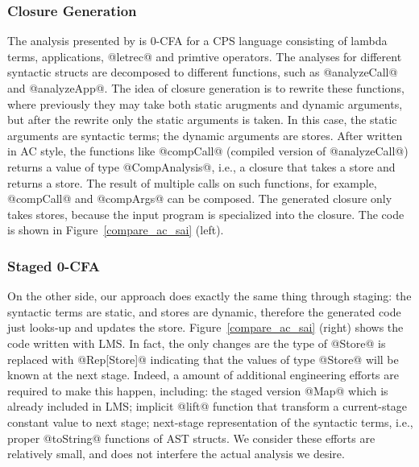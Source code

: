 \subsubsection{Closure Generation}

The analysis presented by \citeauthor{Boucher:1996:ACN:647473.727587} is 0-CFA for a CPS language consisting
of lambda terms, applications, @letrec@ and primtive operators. The analyses for different syntactic 
structs are decomposed to different functions, such as @analyzeCall@ and @analyzeApp@. The idea of closure
generation is to rewrite these functions, where previously they may take both static arugments and dynamic arguments,
but after the rewrite only the static arguments is taken. In this case, the static arguments are syntactic terms;
the dynamic arguments are stores. After written in AC style, the functions like @compCall@ (compiled version of @analyzeCall@) 
returns a value of type
@CompAnalysis@, i.e., a closure that takes a store and returns a store. The result of multiple calls on such functions, for example,
@compCall@ and @compArgs@ can be composed. The generated closure only takes stores, because the input program
is specialized into the closure. The code is shown in Figure~\ref{compare_ac_sai} (left).

\subsubsection{Staged 0-CFA}

On the other side, our approach does exactly the same thing through staging: the syntactic terms are static, and 
stores are dynamic, therefore the generated code just looks-up and updates the store.
Figure~\ref{compare_ac_sai} (right) shows the code written with LMS. In fact, the only changes are
the type of @Store@ is replaced with @Rep[Store]@ indicating that the values of type @Store@  will be known
at the next stage. Indeed, a amount of additional engineering efforts are required to make this happen, 
including: the staged version @Map@ which is already included in LMS; implicit @lift@ function that transform a
current-stage constant value to next stage; next-stage representation of the syntactic terms, i.e., proper @toString@
functions of AST structs. We consider these efforts are relatively small, and does not interfere the actual analysis
we desire.


